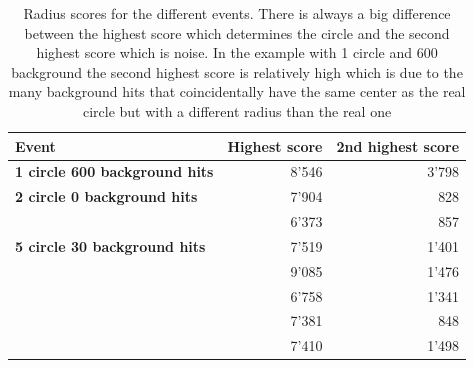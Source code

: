 \documentclass[11pt,twoside]{scrreprt}
\begin{document}
\begin{table}[tbp]
  \caption{Radius scores for the different events. There is always a big difference between the highest score
  which determines the circle and the second highest score which is noise. In the example with 1 circle and 600
  background the second highest score is relatively high which is due to the many background hits that coincidentally
  have the same center as the real circle but with a different radius than the real one}
  \label{tab:1d_scores}
  \centering

  \begin{tabular}{lrr}
  \toprule




  \midrule
  \textbf{Event} & \textbf{Highest score} & \textbf{2nd highest score} \\
  \midrule
  \textbf{1 circle 600 background hits} & 8'546 & 3'798\\
  \midrule
  \textbf{2 circle 0 background hits} & 7'904 & 828\\
   & 6'373 & 857\\
  \midrule
  \textbf{5 circle 30 background hits} & 7'519 & 1'401\\
  & 9'085 & 1'476\\
  & 6'758 & 1'341\\
  & 7'381 & 848\\
  & 7'410 & 1'498\\
  \bottomrule
  \end{tabular}
\end{table}
\end{document}
